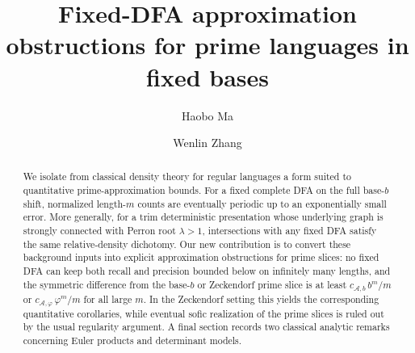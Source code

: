 \documentclass[11pt,a4paper]{amsart}
\title[Fixed-DFA Approximation of Prime Languages]{Fixed-DFA approximation obstructions for prime languages in fixed bases}
\author{Haobo Ma}
\author{Wenlin Zhang}
\date{}
\theoremstyle{plain}
\theoremstyle{definition}
\theoremstyle{remark}
\begin{document}
\begin{abstract}
We isolate from classical density theory for regular languages a form
suited to quantitative prime-approximation bounds. For a fixed complete
DFA on the full base-\(b\) shift, normalized length-\(m\) counts are
eventually periodic up to an exponentially small error. More generally,
for a trim deterministic presentation whose underlying graph is
strongly connected with Perron root \(\lambda>1\), intersections with
any fixed DFA satisfy the same relative-density dichotomy. Our new
contribution is to convert these background inputs into explicit
approximation obstructions for prime slices: no fixed DFA can keep both
recall and precision bounded below on infinitely many lengths, and the
symmetric difference from the base-\(b\) or Zeckendorf prime slice is
at least \(c_{\mathcal A,b}\,b^m/m\) or
\(c_{\mathcal A,\varphi}\,\varphi^m/m\) for all large \(m\). In the
Zeckendorf setting this yields the corresponding quantitative
corollaries, while eventual sofic realization of the prime slices is
ruled out by the usual regularity argument. A final section records two
classical analytic remarks concerning Euler products and determinant
models.
\end{abstract}


\maketitle






\end{document}
